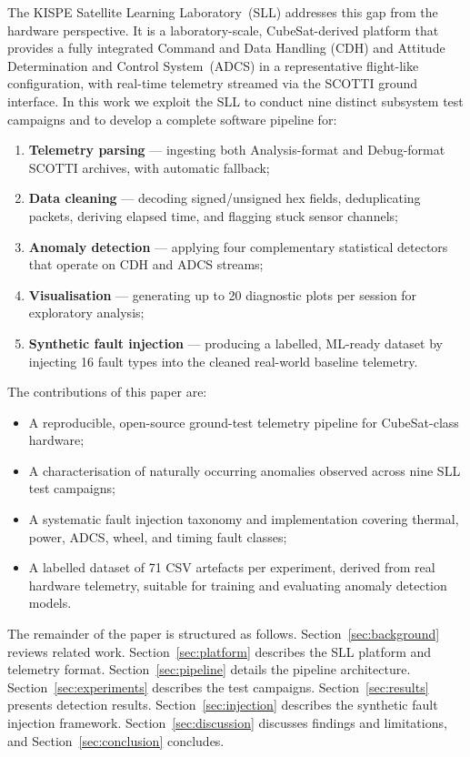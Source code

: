 \documentclass[conference]{IEEEtran}
\begin{document}
The KISPE Satellite Learning Laboratory~(SLL) addresses this gap from
the hardware perspective.  It is a laboratory-scale, CubeSat-derived
platform that provides a fully integrated Command and Data Handling
(CDH) and Attitude Determination and Control System~(ADCS) in a
representative flight-like configuration, with real-time telemetry
streamed via the SCOTTI ground interface.  In this work we exploit the
SLL to conduct nine distinct subsystem test campaigns and to develop a
complete software pipeline for:

\begin{enumerate}
  \item \textbf{Telemetry parsing} — ingesting both Analysis-format and
        Debug-format SCOTTI archives, with automatic fallback;
  \item \textbf{Data cleaning} — decoding signed/unsigned hex fields,
        deduplicating packets, deriving elapsed time, and flagging
        stuck sensor channels;
  \item \textbf{Anomaly detection} — applying four complementary
        statistical detectors that operate on CDH and ADCS streams;
  \item \textbf{Visualisation} — generating up to 20 diagnostic plots
        per session for exploratory analysis;
  \item \textbf{Synthetic fault injection} — producing a labelled,
        ML-ready dataset by injecting 16 fault types into the cleaned
        real-world baseline telemetry.
\end{enumerate}

The contributions of this paper are:
\begin{itemize}
  \item A reproducible, open-source ground-test telemetry pipeline
        for CubeSat-class hardware;
  \item A characterisation of naturally occurring anomalies observed
        across nine SLL test campaigns;
  \item A systematic fault injection taxonomy and implementation
        covering thermal, power, ADCS, wheel, and timing fault classes;
  \item A labelled dataset of 71 CSV artefacts per experiment,
        derived from real hardware telemetry, suitable for training and
        evaluating anomaly detection models.
\end{itemize}

The remainder of the paper is structured as follows.
Section~\ref{sec:background} reviews related work.
Section~\ref{sec:platform} describes the SLL platform and telemetry
format.
Section~\ref{sec:pipeline} details the pipeline architecture.
Section~\ref{sec:experiments} describes the test campaigns.
Section~\ref{sec:results} presents detection results.
Section~\ref{sec:injection} describes the synthetic fault injection
framework.
Section~\ref{sec:discussion} discusses findings and limitations, and
Section~\ref{sec:conclusion} concludes.
\end{document}
